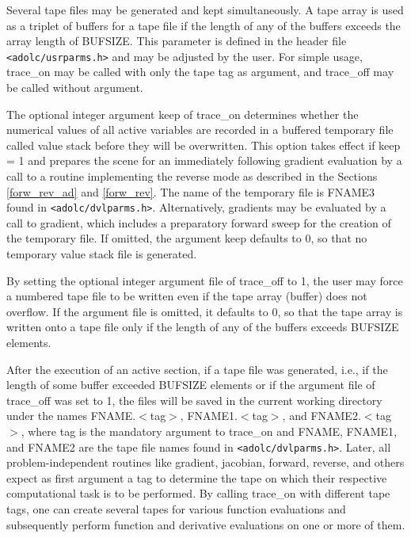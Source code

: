 \documentclass[11pt,twoside]{article}
\begin{document}
Several tape files may be generated and kept simultaneously.
A tape array is used as a triplet of buffers for a tape file if
the length of any of the buffers exceeds the array length of 
{\sf BUFSIZE}. This parameter is 
defined in the header file \verb=<adolc/usrparms.h>=
and may be adjusted by the user. 
For simple usage, {\sf trace\_on} may be called with only the tape
{\sf tag} as argument, and {\sf trace\_off} may be called 
without argument.

The optional integer argument {\sf keep} of 
{\sf trace\_on} determines whether the numerical values of all
active variables are recorded in a buffered temporary file called value
stack before they will be overwritten. 
This option takes effect if
{\sf keep} = 1 and prepares the scene for an immediately following
gradient evaluation by a call to a routine implementing the reverse mode
as described in the Sections \ref{forw_rev_ad} and \ref{forw_rev}. 
The name of the temporary file
is {\sf FNAME3} found in \verb=<adolc/dvlparms.h>=.
Alternatively, gradients may be evaluated by a call
to {\sf gradient}, which includes a preparatory forward sweep
for the creation of the temporary file. If omitted, the argument 
{\sf  keep} defaults to 0, so that no temporary
value stack file is generated. 

By setting the optional integer argument {\sf file} of 
{\sf  trace\_off} to 1, the user may force a numbered  tape
file to be written even if the tape array (buffer) does not overflow.
If the argument {\sf file} is omitted, it 
defaults to 0, so that the tape array is written onto a tape file only 
if the length of any of the buffers exceeds {\sf BUFSIZE} elements.

After the execution of an active section, if a tape file was generated, i.e.,
if the length of some buffer exceeded {\sf BUFSIZE} elements or if the 
argument {\sf file} of {\sf trace\_off} was set to 1, the files will be
saved in the current working directory under the names 
{\sf FNAME.}$<${\sf tag}$>$, {\sf FNAME1.}$<${\sf tag}$>$, and 
{\sf FNAME2.}$<${\sf tag}$>$,  where {\sf tag} is the mandatory argument 
to {\sf trace\_on} and {\sf FNAME}, {\sf FNAME1}, and {\sf FNAME2} are 
the tape file
names found in \verb=<adolc/dvlparms.h>=. Later, all problem-independent routines
like {\sf gradient}, {\sf jacobian}, {\sf forward}, {\sf reverse}, and others
expect as first argument a {\sf tag} to determine
the tape on which their respective computational task is to be performed.
By calling {\sf trace\_on} with different tape {\sf tag}s, one can create
several tapes for various function evaluations and subsequently perform
function and derivative evaluations on one or more of them. 
\end{document}
